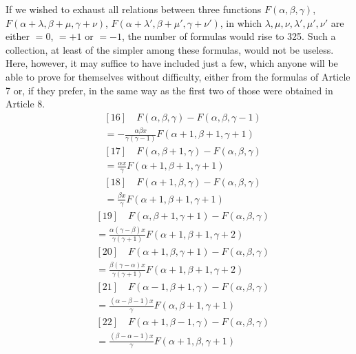 If we wished to exhaust all relations between three functions $F(\alpha,\beta,\gamma)$, $F(\alpha+\lambda,\beta+\mu,\gamma+\nu)$, $F(\alpha+\lambda',\beta+\mu',\gamma+\nu')$, in which $\lambda,\mu,\nu,\lambda',\mu',\nu'$ are either $=0$, $=+1$ or $=-1$, the number of formulas would rise to 325. Such a collection, at least of the simpler among these formulas, would not be useless. Here, however, it may suffice to have included just a few, which anyone will be able to prove for themselves without difficulty, either from the formulas of Article 7 or, if they prefer, in the same way as the first two of those were obtained in Article 8.
\[
\begin{aligned}&[16]\quad F(\alpha,\beta,\gamma)-F(\alpha,\beta,\gamma-1)\\&{}=-\frac{\alpha\beta x}{\gamma(\gamma-1)}F(\alpha+1,\beta+1,\gamma+1)
\end{aligned}
\]
\[
\begin{aligned}&[17]\quad F(\alpha,\beta+1,\gamma)-F(\alpha,\beta,\gamma)\\&{}=\frac{\alpha x}{\gamma}F(\alpha+1,\beta+1,\gamma+1)
\end{aligned}
\]
\[
\begin{aligned}&[18]\quad F(\alpha+1,\beta,\gamma)-F(\alpha,\beta,\gamma)\\&{}=\frac{\beta x}{\gamma}F(\alpha+1,\beta+1,\gamma+1)
\end{aligned}
\]
\[
\begin{aligned}&[19]\quad F(\alpha,\beta+1,\gamma+1)-F(\alpha,\beta,\gamma)\\&{}=\frac{\alpha(\gamma-\beta)x}{\gamma(\gamma+1)}F(\alpha+1,\beta+1,\gamma+2)
\end{aligned}
\]
\[
\begin{aligned}&[20]\quad F(\alpha+1,\beta,\gamma+1)-F(\alpha,\beta,\gamma)\\&{}=\frac{\beta(\gamma-\alpha)x}{\gamma(\gamma+1)}F(\alpha+1,\beta+1,\gamma+2)
\end{aligned}
\]
\[
\begin{aligned}&[21]\quad F(\alpha-1,\beta+1,\gamma)-F(\alpha,\beta,\gamma)\\&{}=\frac{(\alpha-\beta-1)x}{\gamma}F(\alpha,\beta+1,\gamma+1)
\end{aligned}
\]
\[
\begin{aligned}&[22]\quad F(\alpha+1,\beta-1,\gamma)-F(\alpha,\beta,\gamma)\\&{}=\frac{(\beta-\alpha-1)x}{\gamma}F(\alpha+1,\beta,\gamma+1)
\end{aligned}
\]
